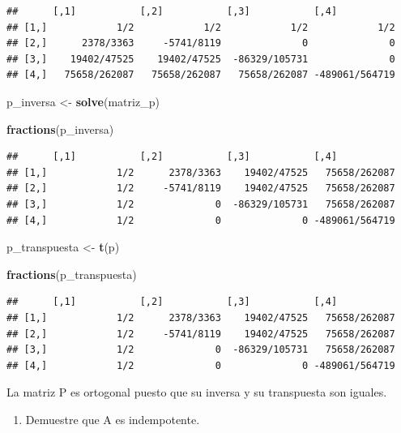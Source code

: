 \documentclass[]{article}
\newenvironment{Shaded}{\begin{snugshade}}{\end{snugshade}}
\newcommand{\KeywordTok}[1]{\textcolor[rgb]{0.13,0.29,0.53}{\textbf{#1}}}
\newcommand{\NormalTok}[1]{#1}
\newcommand{\StringTok}[1]{\textcolor[rgb]{0.31,0.60,0.02}{#1}}
\providecommand{\tightlist}{%
  \setlength{\itemsep}{0pt}\setlength{\parskip}{0pt}}
\begin{document}
\begin{verbatim}
##      [,1]           [,2]           [,3]           [,4]          
## [1,]            1/2            1/2            1/2            1/2
## [2,]      2378/3363     -5741/8119              0              0
## [3,]    19402/47525    19402/47525  -86329/105731              0
## [4,]   75658/262087   75658/262087   75658/262087 -489061/564719
\end{verbatim}

\begin{Shaded}
\begin{Highlighting}[]
\NormalTok{p_inversa <-}\StringTok{ }\KeywordTok{solve}\NormalTok{(matriz_p)}

\KeywordTok{fractions}\NormalTok{(p_inversa)}
\end{Highlighting}
\end{Shaded}

\begin{verbatim}
##      [,1]           [,2]           [,3]           [,4]          
## [1,]            1/2      2378/3363    19402/47525   75658/262087
## [2,]            1/2     -5741/8119    19402/47525   75658/262087
## [3,]            1/2              0  -86329/105731   75658/262087
## [4,]            1/2              0              0 -489061/564719
\end{verbatim}

\begin{Shaded}
\begin{Highlighting}[]
\NormalTok{p_transpuesta <-}\StringTok{ }\KeywordTok{t}\NormalTok{(p)}

\KeywordTok{fractions}\NormalTok{(p_transpuesta)}
\end{Highlighting}
\end{Shaded}

\begin{verbatim}
##      [,1]           [,2]           [,3]           [,4]          
## [1,]            1/2      2378/3363    19402/47525   75658/262087
## [2,]            1/2     -5741/8119    19402/47525   75658/262087
## [3,]            1/2              0  -86329/105731   75658/262087
## [4,]            1/2              0              0 -489061/564719
\end{verbatim}

La matriz P es ortogonal puesto que su inversa y su transpuesta son
iguales.

\begin{enumerate}
\def\labelenumi{\arabic{enumi}.}
\setcounter{enumi}{1}
\tightlist
\item
  Demuestre que A es indempotente.
\end{enumerate}
\end{document}
